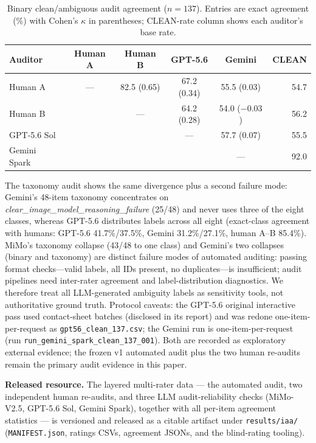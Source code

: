 \begin{table}[h]
\centering
\footnotesize
\setlength{\tabcolsep}{4pt}
\caption{Binary clean/ambiguous audit agreement ($n{=}137$). Entries are
exact agreement (\%) with Cohen's $\kappa$ in parentheses; CLEAN-rate column
shows each auditor's base rate.}
\label{tab:auditor-matrix}
\begin{tabular}{lccccr}
\toprule
Auditor & Human A & Human B & GPT-5.6 & Gemini & CLEAN \\
\midrule
Human A & --- & 82.5 (0.65) & 67.2 (0.34) & 55.5 (0.03) & 54.7 \\
Human B & & --- & 64.2 (0.28) & 54.0 ($-0.03$) & 56.2 \\
GPT-5.6 Sol & & & --- & 57.7 (0.07) & 55.5 \\
Gemini Spark & & & & --- & 92.0 \\
\bottomrule
\end{tabular}
\end{table}

The taxonomy audit shows the same divergence plus a second failure mode:
Gemini's 48-item taxonomy concentrates on
\emph{clear\_image\_model\_reasoning\_failure} (25/48) and never uses three of
the eight classes, whereas GPT-5.6 distributes labels across all eight
(exact-class agreement with humans: GPT-5.6 41.7\%/37.5\%, Gemini
31.2\%/27.1\%, human A--B 85.4\%). MiMo's taxonomy collapse (43/48 to one
class) and Gemini's two collapses (binary and taxonomy) are distinct
failure modes of automated auditing: passing format checks---valid labels,
all IDs present, no duplicates---is insufficient; audit pipelines need
inter-rater agreement and label-distribution diagnostics. We therefore treat
all LLM-generated ambiguity labels as sensitivity tools, not authoritative
ground truth. Protocol caveats: the GPT-5.6 original interactive pass used
contact-sheet batches (disclosed in its report) and was redone
one-item-per-request as \texttt{gpt56\_clean\_137.csv}; the Gemini run is
one-item-per-request (run \texttt{run\_gemini\_spark\_clean\_137\_001}). Both
are recorded as exploratory external evidence; the frozen v1 automated audit
plus the two human re-audits remain the primary audit evidence in this paper.

\textbf{Released resource.} The layered multi-rater data --- the automated
audit, two independent human re-audits, and three LLM audit-reliability
checks (MiMo-V2.5, GPT-5.6 Sol, Gemini Spark), together with all per-item
agreement statistics --- is versioned and released as a citable artifact
under \texttt{results/iaa/} (\texttt{MANIFEST.json}, ratings CSVs, agreement
JSONs, and the blind-rating tooling).

